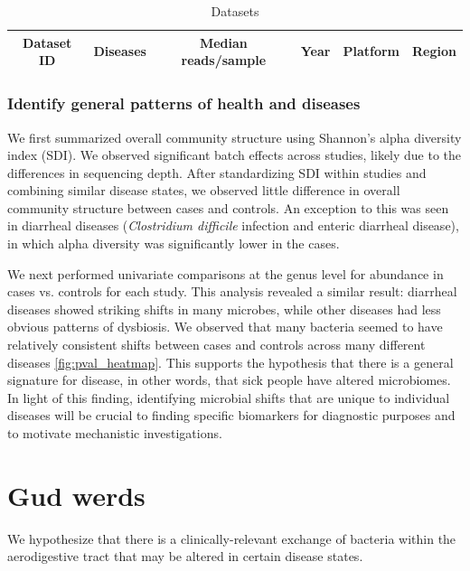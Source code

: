 \documentclass[12pt]{article}
\begin{document}
\begin{table}
\begin{tabular}{|c|c|c|c|c|c|}
	\hline
	\textbf{Dataset ID} & \textbf{Diseases} & \textbf{Median reads/sample} & \textbf{Year} & \textbf{Platform} & \textbf{Region} \\
	\hline 
\end{tabular}
\caption{Datasets}\label{tab:datasets}
\end{table}

\subsubsection{Identify general patterns of health and diseases}
We first summarized overall community structure using Shannon's alpha diversity
index (SDI). We observed significant batch effects across studies, likely due to
the differences in sequencing depth. After standardizing SDI within studies
and combining similar disease states, we observed little difference in overall
community structure between cases and controls. An exception to this was seen
in diarrheal diseases (\textit{Clostridium difficile} infection and enteric 
diarrheal disease), in which alpha diversity was significantly lower in the cases. 

We next performed univariate comparisons at the genus level for abundance in cases 
vs. controls for each study. This analysis revealed a similar result: diarrheal 
diseases showed striking shifts in many microbes, while other
diseases had less obvious patterns of dysbiosis. We observed that many bacteria
seemed to have relatively consistent shifts between cases and controls across many
different diseases \ref{fig:pval_heatmap}. This supports the hypothesis that
there is a general signature for disease, in other words, that sick people have 
altered microbiomes. In light of this finding, identifying microbial shifts that 
are unique to individual diseases will be crucial to finding specific biomarkers
for diagnostic purposes and to motivate mechanistic investigations.

\section{Gud werds}
We hypothesize that there is a clinically-relevant exchange of bacteria within the aerodigestive tract that may be altered in certain disease states. 
\end{document}
